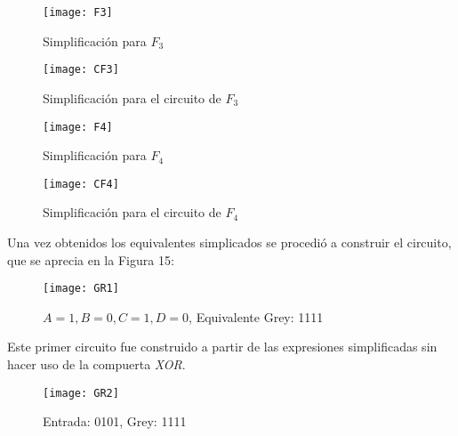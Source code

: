 \documentclass[a4paper,12pt]{article}
\begin{document}
\newpage

\begin{figure}[ht!]
	\centering

	\texttt{[image: F3]}

	\caption{Simplificación para $F_3$}
\end{figure}

\vspace{1cm}

\begin{figure}[ht!]
	\centering

	\texttt{[image: CF3]}

	\caption{Simplificación para el circuito de $F_3$}
\end{figure}

\newpage

\begin{figure}[ht!]
	\centering

	\texttt{[image: F4]}

	\caption{Simplificación para $F_4$}
\end{figure}

\vspace{1cm}

\begin{figure}[ht!]
	\centering

	\texttt{[image: CF4]}

	\caption{Simplificación para el circuito de $F_4$}
\end{figure}



\newpage

Una vez obtenidos los equivalentes simplicados se procedió a construir el circuito, que se aprecia en la Figura 15:


\begin{figure}[ht!]
	\centering

	\texttt{[image: GR1]}

	\caption{$A=1, B=0, C=1,D=0$, Equivalente Grey: 1111}
\end{figure}

Este primer circuito fue construido a partir de las expresiones simplificadas sin hacer uso de la compuerta \emph{XOR}.\par


\begin{figure}[ht!]
	\centering

	\texttt{[image: GR2]}

	\caption{Entrada: 0101, Grey: 1111}
\end{figure}
\end{document}
